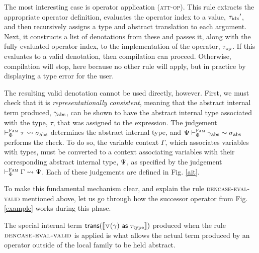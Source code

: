 \documentclass{llncs}
\begin{document}
The most interesting case is operator application (\textsc{att-op}). This rule extracts the appropriate operator definition, evaluates the operator index to a value, ${\tau_{\text{idx}}}'$, and then recursively assigns a type and abstract translation to each argument. Next, it constructs a list of denotations from these and passes it, along with the fully evaluated operator index, to the implementation of the operator, ${\tau_{\text{op}}}$. If this evaluates to a valid denotation, then compilation can proceed. Otherwise, compilation will stop, here because no other rule will apply, but in practice by displaying a type error for the user. 

The resulting valid denotation cannot be used directly, however. First, we must check that it is \emph{representationally consistent}, meaning that the abstract internal term produced, $\gamma_{\text{abs}}$, can be shown to have the abstract internal type associated with the type, $\tau$, that was assigned to the expression. The judgement $\vdash^{\textsc{Fam}}_{\Phi} \tau \leadsto \sigma_{\text{abs}}$ determines the abstract internal type, and $\Psi \vdash^{\textsc{Fam}}_{\Phi} \gamma_{\text{abs}} \sim \sigma_{\text{abs}}$ performs the check. To do so, the variable context $\Gamma$, which associates variables with types, must be converted to a context associating variables with their corresponding abstract internal type, $\Psi$, as specified by the judgement $\vdash^{\textsc{Fam}}_{\Phi} \Gamma \leadsto \Psi$. Each of these judgements are defined in Fig. \ref{ait}. 


To make this fundamental mechanism clear, and explain the rule \textsc{dencase-eval-valid} mentioned above, let us go through how the successor operator from Fig. \ref{example} works during this phase. 

The special internal term ${\sf trans}(\llbracket \triangledown(\gamma)~{\sf as}~{\tau_{\text{type}}} \rrbracket)$ produced when the rule $\textsc{dencase-eval-valid}$ is applied is what allows the actual term produced by an operator outside of the local family to be held abstract.
\end{document}
